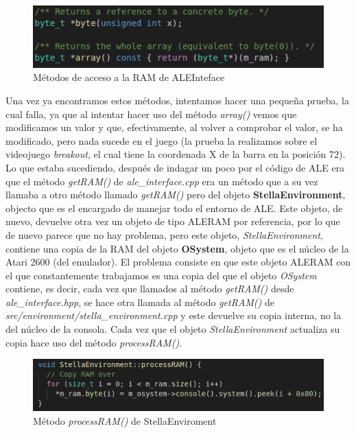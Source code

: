 \begin{figure}[h]
	\centering
	\includegraphics[width=1\textwidth]{Figures/ALEMethodsToGetReferencesToRAM}
	\caption{Métodos de acceso a la RAM de ALEInteface}
	\label{fig:ALEMethodsToGetReferencesToRAM}
\end{figure}

\newpage
Una vez ya encontramos estos métodos, intentamos hacer una pequeña prueba, la cual falla, ya que al intentar hacer uso del método \textit{array()} vemos que modificamos un valor y que, efectivamente, al volver a comprobar el valor, se ha modificado, pero nada sucede en el juego (la prueba la realizamos sobre el videojuego \textit{breakout}, el cual tiene la coordenada X de la barra en la posición 72). Lo que estaba sucediendo, después de indagar un poco por el código de ALE era que el método \textit{getRAM()} de \textit{ale\_interface.cpp} era un método que a su vez llamaba a otro método llamado \textit{getRAM()} pero del objeto \textbf{StellaEnvironment}, objecto que es el encargado de manejar todo el entorno de ALE. Este objeto, de nuevo, devuelve otra vez un objeto de tipo ALERAM por referencia, por lo que de nuevo parece que no hay problema, pero este objeto, \textit{StellaEnvironment}, contiene una copia de la RAM del objeto \textbf{OSystem}, objeto que es el núcleo de la Atari 2600 (del emulador). El problema consiste en que este objeto ALERAM con el que constantemente trabajamos es una copia del que el objeto \textit{OSystem} contiene, es decir, cada vez que llamados al método \textit{getRAM()} desde \textit{ale\_interface.hpp}, se hace otra llamada al método \textit{getRAM()} de \textit{src/environment/stella\_environment.cpp} y este devuelve su copia interna, no la del núcleo de la consola. Cada vez que el objeto \textit{StellaEnvironment} actualiza su copia hace uso del método \textit{processRAM()}.

\begin{figure}[h]
	\centering
	\includegraphics[width=1\textwidth]{Figures/StellaEnviromentProcessRAMMethod}
	\caption{Método \textit{processRAM()} de StellaEnviroment}
	\label{fig:StellaEnviromentProcessRAMMethod}
\end{figure}

